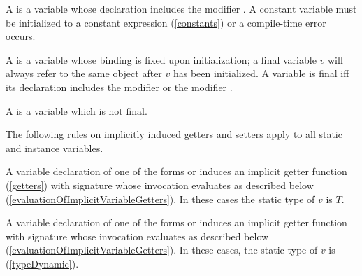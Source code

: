 \documentclass[makeidx]{article}
\begin{document}
\LMHash{}%
A 
is a variable whose declaration includes the modifier \CONST{}.
A constant variable must be initialized to a constant expression (\ref{constants}) or a compile-time error occurs.


\LMHash{}%
A 
is a variable whose binding is fixed upon initialization;
a final variable $v$ will always refer to the same object after $v$ has been initialized.
A variable is final if{}f its declaration includes the modifier \FINAL{} or the modifier \CONST{}.

\LMHash{}%
A 
is a variable which is not final.


\LMHash{}%
The following rules on implicitly induced getters and setters
apply to all static and instance variables.

\LMHash{}%
A variable declaration of one of the forms
or 
induces an implicit getter function (\ref{getters}) with signature
whose invocation evaluates as described below
(\ref{evaluationOfImplicitVariableGetters}).
In these cases the static type of $v$ is $T$.

\LMHash{}%
A variable declaration of one of the forms
or 
induces an implicit getter function with signature
whose invocation evaluates as described below
(\ref{evaluationOfImplicitVariableGetters}).
In these cases, the static type of $v$ is \DYNAMIC{}
(\ref{typeDynamic}).
\end{document}
